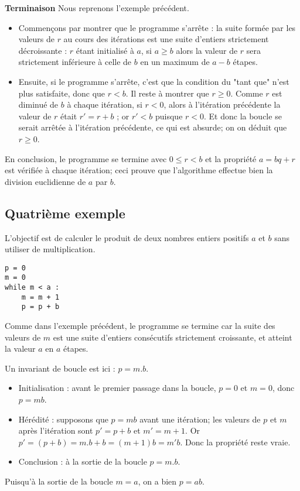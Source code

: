 \textbf{Terminaison}
Nous reprenons l’exemple précédent.
\begin{itemize}
\item Commençons par montrer que le programme s’arrête : la suite formée par les valeurs de $r$ au cours
des itérations est une suite d’entiers strictement décroissante : $r$ étant initialisé à $a$, si $a \geq b$ alors
la valeur de $r$ sera strictement inférieure à celle de $b$ en un maximum de $a - b$ étapes.
\item Ensuite, si le programme s’arrête, c’est que la condition du "tant que" n’est plus satisfaite, donc
que $r < b$. Il reste à montrer que $r \geq 0$. Comme $r$ est diminué de $b$ à chaque itération, si $r < 0$,
alors à l’itération précédente la valeur de $r$ était $r' = r + b$ ; or $r' < b$ puisque $r < 0$. Et donc la
boucle se serait arrêtée à l’itération précédente, ce qui est absurde; on on déduit que $r \geq 0$.
\end{itemize}
En conclusion, le programme se termine avec $0 \leq r < b$ et la propriété $a = bq + r$ est vérifiée à chaque
itération; ceci prouve que l’algorithme effectue bien la division euclidienne de $a$ par $b$.



\subsection{Quatrième exemple }
L’objectif est de calculer le produit de deux nombres entiers positifs $a$ et $b$ sans utiliser de multiplication.
\begin{lstlisting}
p = 0
m = 0
while m < a :
    m = m + 1
    p = p + b
\end{lstlisting}

Comme dans l’exemple précédent, le programme se termine car la suite des valeurs de $m$ est une suite
d’entiers consécutifs strictement croissante, et atteint la valeur $a$ en $a$ étapes.

Un invariant de boucle est ici : $p = m.b$.

\begin{itemize}
\item Initialisation : avant le premier passage dans la boucle, $p = 0$ et $m = 0$, donc $p = mb$.
\item Hérédité : supposons que $p = mb$ avant une itération; les valeurs de $p$ et $m$ après l’itération sont
$p'= p + b$ et $m' = m + 1$. Or $p'= (p + b) = m.b + b = (m + 1)b = m'b$. Donc la propriété
reste vraie.
\item Conclusion : à la sortie de la boucle $p = m.b$.
\end{itemize}
Puisqu’à la sortie de la boucle $m = a$, on a bien $p = ab$.